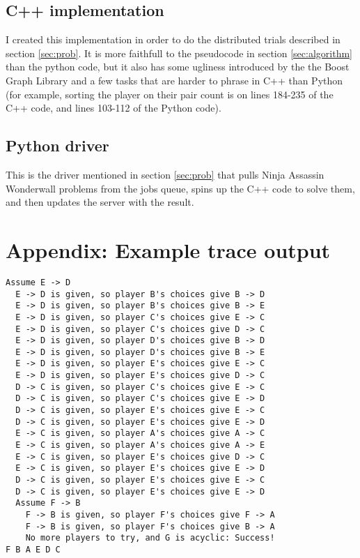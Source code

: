 \documentclass[12pt,x11names, rgb]{article}
\begin{document}
    \subsection{C++ implementation}
        I created this implementation in order to do the distributed trials described in section \ref{sec:prob}. It is more faithfull to the pseudocode in section \ref{sec:algorithm} than the python code, but it also has some ugliness introduced by the the Boost Graph Library and a few tasks that are harder to phrase in C++ than Python (for example, sorting the player on their pair count is on lines 184-235 of the C++ code, and lines 103-112 of the Python code).
        
    \subsection{Python driver}
        This is the driver mentioned in section \ref{sec:prob} that pulls Ninja Assassin Wonderwall problems from the jobs queue, spins up the C++ code to solve them, and then updates the server with the result.
        

\section{Appendix: Example trace output}
\label{app:example_output}
\begin{verbatim}
Assume E -> D
  E -> D is given, so player B's choices give B -> D
  E -> D is given, so player B's choices give B -> E
  E -> D is given, so player C's choices give E -> C
  E -> D is given, so player C's choices give D -> C
  E -> D is given, so player D's choices give B -> D
  E -> D is given, so player D's choices give B -> E
  E -> D is given, so player E's choices give E -> C
  E -> D is given, so player E's choices give D -> C
  D -> C is given, so player C's choices give E -> C
  D -> C is given, so player C's choices give E -> D
  D -> C is given, so player E's choices give E -> C
  D -> C is given, so player E's choices give E -> D
  E -> C is given, so player A's choices give A -> C
  E -> C is given, so player A's choices give A -> E
  E -> C is given, so player E's choices give D -> C
  E -> C is given, so player E's choices give E -> D
  D -> C is given, so player E's choices give E -> C
  D -> C is given, so player E's choices give E -> D
  Assume F -> B
    F -> B is given, so player F's choices give F -> A
    F -> B is given, so player F's choices give B -> A
    No more players to try, and G is acyclic: Success!
F B A E D C
\end{verbatim}
\end{document}

